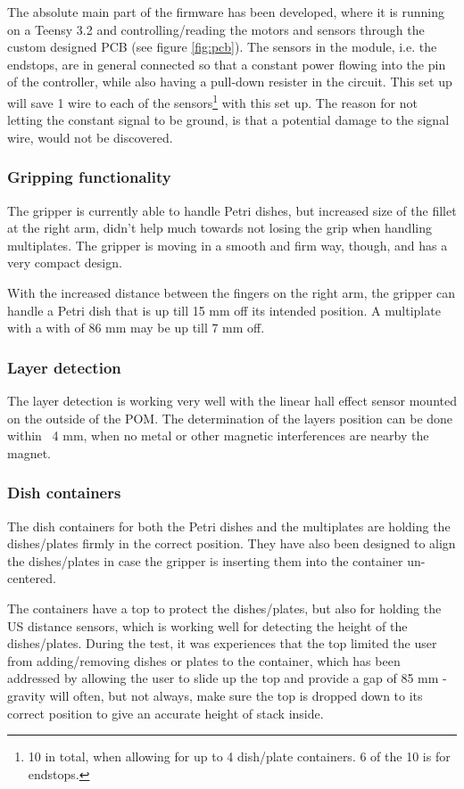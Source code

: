 \documentclass[10pt,a4paper]{article}
\begin{document}
		The absolute main part of the firmware has been developed, where it is running on a Teensy 3.2 and controlling/reading the motors and sensors through the custom designed PCB (see figure \ref{fig:pcb}). The sensors in the module, i.e. the endstops, are in general connected so that a constant power flowing into the pin of the controller, while also having a pull-down resister in the circuit. This set up will save 1 wire to each of the sensors\footnote{10 in total, when allowing for up to 4 dish/plate containers. 6 of the 10 is for endstops.} with this set up. The reason for not letting the constant signal to be ground, is that a potential damage to the signal wire, would not be discovered.
		
			
		\subsubsection{Gripping functionality}
		The gripper is currently able to handle Petri dishes, but increased size of the fillet at the right arm, didn't help much towards not losing the grip when handling multiplates. The gripper is moving in a smooth and firm way, though, and has a very compact design.
		
		With the increased distance between the fingers on the right arm, the gripper can handle a Petri dish that is up till 15 mm off its intended position. A multiplate with a with of 86 mm may be up till 7 mm off.
		
		
		\subsubsection{Layer detection}
		The layer detection is working very well with the linear hall effect sensor mounted on the outside of the POM. The determination of the layers position can be done within ~4 mm, when no metal or other magnetic interferences are nearby the magnet.
				
		\subsubsection{Dish containers}	
		The dish containers for both the Petri dishes and the multiplates are holding the dishes/plates firmly in the correct position. They have also been designed to align the dishes/plates in case the gripper is inserting them into the container un-centered.
		
		The containers have a top to protect the dishes/plates, but also for holding the US distance sensors, which is working well for detecting the height of the dishes/plates. During the test, it was experiences that the top limited the user from adding/removing dishes or plates to the container, which has been addressed by allowing the user to slide up the top and provide a gap of 85 mm - gravity will often, but not always, make sure the top is dropped down to its correct position to give an accurate height of stack inside.
		
\end{document}
